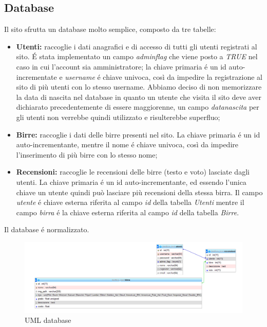 \subsection{Database}
Il sito sfrutta un database molto semplice, composto da tre tabelle:
\begin{itemize}
\item \textbf{Utenti:} raccoglie i dati anagrafici e di accesso di tutti gli utenti registrati al sito. \'E stata implementato un campo \textit{admin\textunderscore flag} che viene posto a \textit{TRUE} nel caso in cui l'account sia amministratore; la chiave primaria é un id auto-incrementate e \textit{username} é chiave univoca, così da impedire la registrazione al sito di più utenti con lo stesso username. Abbiamo deciso di non memorizzare la data di nascita nel database in quanto un utente che visita il sito deve aver dichiarato precedentemente di essere maggiorenne, un campo \textit{data\textunderscore nascita} per gli utenti non verrebbe quindi utilizzato e risulterebbe superfluo;
\item \textbf{Birre:} raccoglie i dati delle birre presenti nel sito. La chiave primaria é un id auto-incrementante, mentre il nome é chiave univoca, così da impedire l'inserimento di più birre con lo stesso nome;
\item \textbf{Recensioni:} raccoglie le recensioni delle birre (testo e voto) lasciate dagli utenti. La chiave primaria é un id auto-incrementante, ed essendo l'unica chiave un utente quindi può lasciare più recensioni della stessa birra. Il campo \textit{utente} é chiave esterna riferita al campo \textit{id} della tabella \textit{Utenti} mentre il campo \textit{birra} é la chiave esterna riferita al campo \textit{id} della tabella \textit{Birre}.
\end{itemize}
Il database é normalizzato.
\begin{figure}[H]
	\centering
	\includegraphics[width=16cm]{utility/db.png}
	\caption{UML database}
\end{figure}


